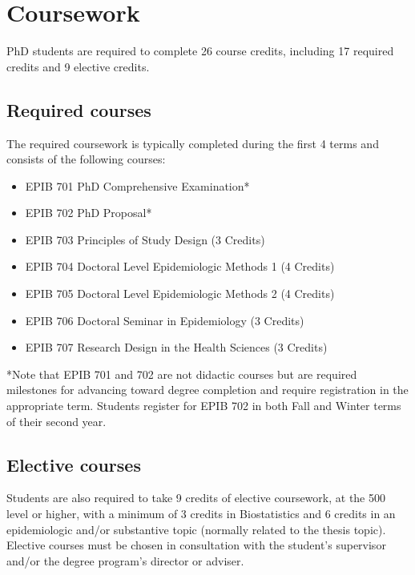 \documentclass[
  letterpaper,
  DIV=11,
  numbers=noendperiod]{scrreprt}
\providecommand{\tightlist}{%
  \setlength{\itemsep}{0pt}\setlength{\parskip}{0pt}}
\begin{document}

\chapter{Coursework}\label{coursework}

PhD students are required to complete 26 course credits, including 17
required credits and 9 elective credits.

\section{Required courses}\label{required-courses}

The required coursework is typically completed during the first 4 terms
and consists of the following courses:

\begin{itemize}
\tightlist
\item
  EPIB 701 PhD Comprehensive Examination*
\item
  EPIB 702 PhD Proposal*
\item
  EPIB 703 Principles of Study Design (3 Credits)
\item
  EPIB 704 Doctoral Level Epidemiologic Methods 1 (4 Credits)
\item
  EPIB 705 Doctoral Level Epidemiologic Methods 2 (4 Credits)
\item
  EPIB 706 Doctoral Seminar in Epidemiology (3 Credits)
\item
  EPIB 707 Research Design in the Health Sciences (3 Credits)
\end{itemize}

*Note that EPIB 701 and 702 are not didactic courses but are required
milestones for advancing toward degree completion and require
registration in the appropriate term. Students register for EPIB 702 in
both Fall and Winter terms of their second year.

\section{Elective courses}\label{elective-courses}

Students are also required to take 9 credits of elective coursework, at
the 500 level or higher, with a minimum of 3 credits in Biostatistics
and 6 credits in an epidemiologic and/or substantive topic (normally
related to the thesis topic). Elective courses must be chosen in
consultation with the student's supervisor and/or the degree program's
director or adviser.
\end{document}
